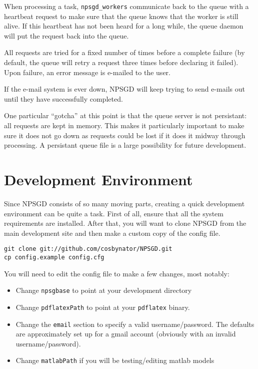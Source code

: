 \documentclass{article}
\begin{document}
When processing a task, \texttt{npsgd\_workers} communicate back to the queue
with a heartbeat request to make sure that the queue knows that the worker is
still alive. If this heartbeat has not been heard for a long while, the queue
daemon will put the request back into the queue.

All requests are tried for a fixed number of times before a complete failure (by
default, the queue will retry a request three times before declaring it failed).
Upon failure, an error message is e-mailed to the user.

If the e-mail system is ever down, NPSGD will keep trying to send e-mails out
until they have successfully completed.

One particular ``gotcha'' at this point is that the queue server is not
persistant: all requests are kept in memory. This makes it particularly
important to make sure it does not go down as requests could be lost if it does
it midway through processing. A persistant queue file is a large possibility for
future development.


\section{Development Environment}
Since NPSGD consists of so many moving parts, creating a quick development
environment can be quite a task. First of all, ensure that all the system
requirements are installed. After that, you will want to clone NPSGD from the
main development site and then make a custom copy of the config file.
\begin{verbatim}
git clone git://github.com/cosbynator/NPSGD.git
cp config.example config.cfg
\end{verbatim}

You will need to edit the config file to make a few changes, most notably:
\begin{itemize}
    \item Change \texttt{npsgbase} to point at your development directory
    \item Change \texttt{pdflatexPath} to point at your \texttt{pdflatex}
    binary.
    \item Change the \texttt{email} section to specify a valid
    username/password. The defaults are approximately set up for a gmail
    account (obviously with an invalid username/password).
    \item Change \texttt{matlabPath} if you will be testing/editing matlab
    models
\end{itemize}
\end{document}
